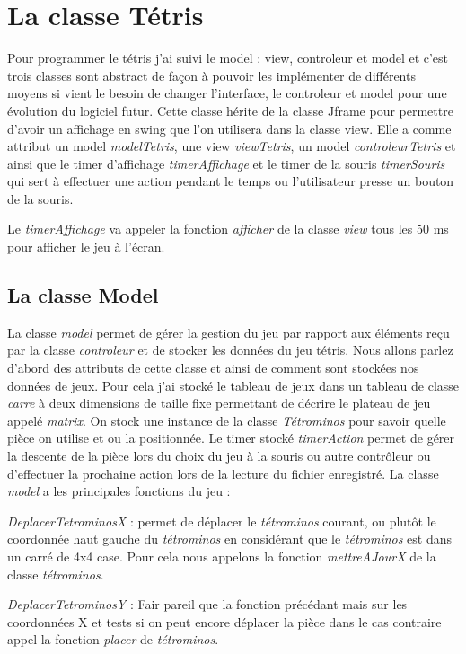 \documentclass{article}           %
\begin{document}
\section{La classe Tétris}
Pour programmer le tétris j'ai suivi le model : view, controleur et model et c'est trois classes sont abstract de façon à pouvoir les implémenter de différents moyens si vient le besoin de changer l'interface, le controleur et model pour une évolution du logiciel futur.
Cette classe hérite de la classe Jframe pour permettre d'avoir un affichage en swing que l'on utilisera dans la classe view. Elle a comme attribut un model \emph{modelTetris}, une view \emph{viewTetris}, un model \emph{controleurTetris} et ainsi que le timer d'affichage \emph{timerAffichage} et le timer de la souris \emph{timerSouris} qui sert à effectuer une action pendant le temps ou l'utilisateur presse un bouton de la souris.

Le \emph{timerAffichage} va appeler la fonction \emph{afficher} de la classe \emph{view} tous les 50 ms pour afficher le jeu à l'écran.

\subsection{La classe Model}
La classe \emph{model} permet de gérer la gestion du jeu par rapport aux éléments reçu par la classe \emph{controleur} et de stocker les données du jeu tétris.
Nous allons parlez d'abord des attributs de cette classe et ainsi de comment sont stockées nos données de jeux. Pour cela j'ai stocké le tableau de jeux dans un tableau de classe \emph{carre} à deux dimensions de taille fixe permettant de décrire le plateau de jeu appelé \emph{matrix}. On stock une instance de la classe \emph{Tétrominos} pour savoir quelle pièce on utilise et ou la positionnée.
Le timer stocké \emph{timerAction} permet de gérer la descente de la pièce lors du choix du jeu à la souris ou autre contrôleur ou d'effectuer la prochaine action lors de la lecture du fichier enregistré.
La classe \emph{model} a les principales fonctions du jeu :

\emph{DeplacerTetrominosX} : permet de déplacer le \emph{tétrominos} courant, ou plutôt le coordonnée haut gauche du \emph{tétrominos} en considérant que le \emph{tétrominos} est dans un carré de 4x4 case. Pour cela nous appelons la fonction \emph{mettreAJourX} de la classe \emph{tétrominos}.

\emph{DeplacerTetrominosY} : Fair pareil que la fonction précédant mais sur les coordonnées X et tests si on peut encore déplacer la pièce dans le cas contraire appel la fonction \emph{placer} de \emph{tétrominos}.
\end{document}
